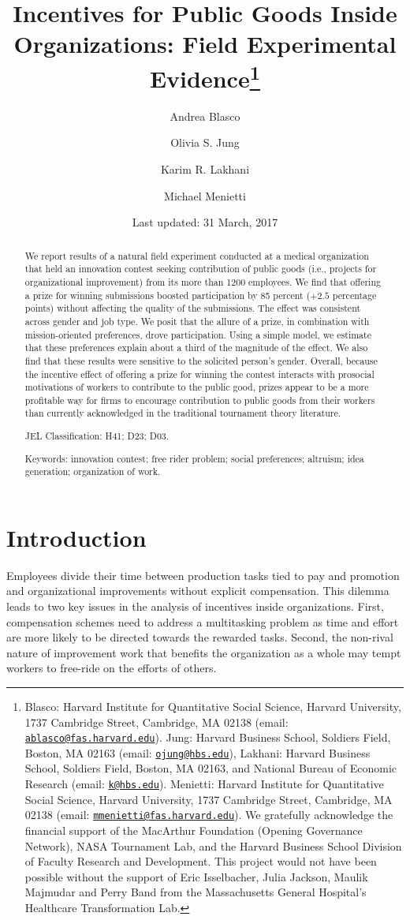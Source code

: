 \documentclass[12pt, titlepage]{article}
\institute{}
\title{Incentives for Public Goods Inside Organizations: Field Experimental
Evidence\thanks{Blasco: Harvard Institute for Quantitative Social Science, Harvard
University, 1737 Cambridge Street, Cambridge, MA 02138 (email:
\href{mailto:ablasco@fas.harvard.edu}{\nolinkurl{ablasco@fas.harvard.edu}}).
Jung: Harvard Business School, Soldiers Field, Boston, MA 02163 (email:
\href{mailto:ojung@hbs.edu}{\nolinkurl{ojung@hbs.edu}}), Lakhani:
Harvard Business School, Soldiers Field, Boston, MA 02163, and National
Bureau of Economic Research (email:
\href{mailto:k@hbs.edu}{\nolinkurl{k@hbs.edu}}). Menietti: Harvard
Institute for Quantitative Social Science, Harvard University, 1737
Cambridge Street, Cambridge, MA 02138 (email:
\href{mailto:mmenietti@fas.harvard.edu}{\nolinkurl{mmenietti@fas.harvard.edu}}).
We gratefully acknowledge the financial support of the MacArthur
Foundation (Opening Governance Network), NASA Tournament Lab, and the
Harvard Business School Division of Faculty Research and Development.
This project would not have been possible without the support of Eric
Isselbacher, Julia Jackson, Maulik Majmudar and Perry Band from the
Massachusetts General Hospital's Healthcare Transformation Lab.}}
\author{Andrea Blasco \and Olivia S. Jung \and Karim R. Lakhani \and Michael Menietti}
\date{Last updated: 31 March, 2017}
\begin{document}
\maketitle
\begin{abstract}
We report results of a natural field experiment conducted at a medical
organization that held an innovation contest seeking contribution of
public goods (i.e., projects for organizational improvement) from its
more than 1200 employees. We find that offering a prize for winning
submissions boosted participation by 85 percent (\(+2.5\) percentage
points) without affecting the quality of the submissions. The effect was
consistent across gender and job type. We posit that the allure of a
prize, in combination with mission-oriented preferences, drove
participation. Using a simple model, we estimate that these preferences
explain about a third of the magnitude of the effect. We also find that
these results were sensitive to the solicited person's gender. Overall,
because the incentive effect of offering a prize for winning the contest
interacts with prosocial motivations of workers to contribute to the
public good, prizes appear to be a more profitable way for firms to
encourage contribution to public goods from their workers than currently
acknowledged in the traditional tournament theory literature.

\smallskip\noindent 
JEL Classification: H41; D23; D03.

\smallskip\noindent 
Keywords: innovation contest; free rider problem; social preferences; altruism; idea generation; organization of work.
\end{abstract}


\clearpage

\section{Introduction}\label{introduction}

Employees divide their time between production tasks tied to pay and
promotion and organizational improvements without explicit compensation.
This dilemma leads to two key issues in the analysis of incentives
inside organizations. First, compensation schemes need to address a
multitasking problem
\citep{holmstrom1991multitask, hellmann2011incentives, manso2011motivating}
as time and effort are more likely to be directed towards the rewarded
tasks. Second, the non-rival nature of improvement work that benefits
the organization as a whole may tempt workers to free-ride on the
efforts of others.
\end{document}
